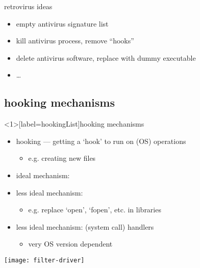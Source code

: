\begin{frame}{retrovirus ideas}
    \begin{itemize}
    \item empty antivirus signature list
    \item kill antivirus process, remove ``hooks''
    \item delete antivirus software, replace with dummy executable
    \item \ldots
    \end{itemize}
\end{frame}

\subsection{hooking mechanisms}

\begin{frame}<1>[label=hookingList]{hooking mechanisms}
    \begin{itemize}
    \item hooking --- getting a `hook' to run on (OS) operations
        \begin{itemize}
        \item e.g. creating new files
        \end{itemize}
    \item ideal mechanism: 
    \item less ideal mechanism: 
        \begin{itemize}
        \item e.g. replace `open', `fopen', etc. in libraries
        \end{itemize}
    \item less ideal mechanism:  (system call) handlers
        \begin{itemize}
        \item very OS version dependent
        \end{itemize} 
    \end{itemize}
\end{frame}


\begin{frame}
\begin{centering}\texttt{[image: filter-driver]}\end{centering}
\end{frame}


